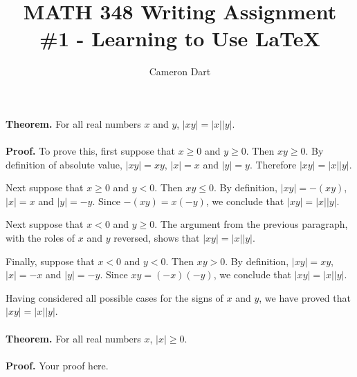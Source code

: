 \documentclass[12pt]{amsart}
\begin{document}
 	


\title{MATH 348 Writing Assignment \#1 - Learning to Use LaTeX}
\author{Cameron Dart}
\maketitle
{\bf Theorem.} For all real numbers $x$ and $y$, $|xy|=|x||y|$.
\\ \\
{\bf Proof.} To prove this, first suppose that $x \ge 0$ and $y \ge 0$.  
Then $xy \ge 0$.
By definition of absolute value, $|xy| = xy$, $|x| = x$ and $|y|=y$. 
Therefore $|xy| = |x| |y|$.

Next suppose that $x \ge 0$ and $y < 0$.  Then $xy \le 0$.  By definition,
$|xy| = -(xy)$, $|x| = x$ and $|y| = -y$.  Since $ -(xy) = x(-y)$, we conclude 
that $|xy| = |x| |y|$.

Next suppose that $x < 0$ and $y \ge 0$. The argument from the previous 
paragraph, with the roles of $x$ and $y$ reversed, shows that $|xy| = |x| |y|$.

Finally, suppose that $x < 0$ and $y < 0$.  Then $xy >0$.  By definition,
$|xy| = xy$, $|x| = -x$ and $|y| = -y$.  Since $xy = (-x) (-y)$, we conclude
that $|xy| = |x| |y|$.

Having considered all possible cases for the signs of $x$ and $y$, we have
proved that $|xy| = |x| |y|$.
\\ \\

{\bf Theorem.} For all real numbers $x$, $|x| \geq 0$.
\\ \\
{\bf Proof.} Your proof here.
\\ \\
\end{document}
